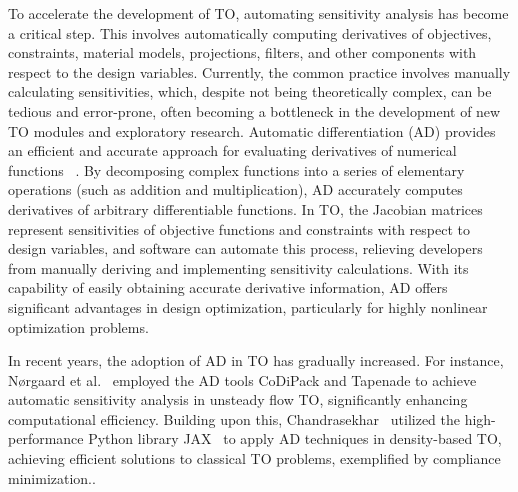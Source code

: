 \documentclass[mathpazo]{cicp}
\begin{document}
To accelerate the development of TO, automating sensitivity analysis has become a critical step. This involves automatically computing derivatives of objectives, constraints, material models, projections, filters, and other components with respect to the design variables. Currently, the common practice involves manually calculating sensitivities, which, despite not being theoretically complex, can be tedious and error-prone, often becoming a bottleneck in the development of new TO modules and exploratory research. Automatic differentiation (AD) provides an efficient and accurate approach for evaluating derivatives of numerical functions ~\cite{griewank2008evaluating}. By decomposing complex functions into a series of elementary operations (such as addition and multiplication), AD accurately computes derivatives of arbitrary differentiable functions. In TO, the Jacobian matrices represent sensitivities of objective functions and constraints with respect to design variables, and software can automate this process, relieving developers from manually deriving and implementing sensitivity calculations. With its capability of easily obtaining accurate derivative information, AD offers significant advantages in design optimization, particularly for highly nonlinear optimization problems.

In recent years, the adoption of AD in TO has gradually increased. For instance, Nørgaard et al.~\cite{norgaard2017applications} employed the AD tools CoDiPack and Tapenade to achieve automatic sensitivity analysis in unsteady flow TO, significantly enhancing computational efficiency. Building upon this, Chandrasekhar~\cite{chandrasekhar2021auto} utilized the high-performance Python library JAX~\cite{bradbury2018jax} to apply AD techniques in density-based TO, achieving efficient solutions to classical TO problems, exemplified by compliance minimization..
\end{document}
